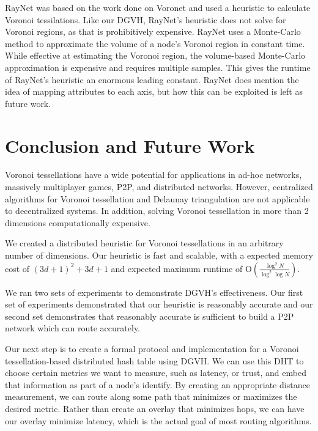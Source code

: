 \documentclass[11pt, conference, letterpaper]{IEEEtran}
\begin{document}
RayNet \cite{raynet} was based on the work done on Voronet and used a heuristic to calculate Voronoi tessilations.  
Like our DGVH, RayNet's heuristic does not solve for Voronoi regions, as that is prohibitively expensive.  
RayNet uses a Monte-Carlo method to approximate the volume of a node's Voronoi region in constant time.  
While effective at estimating the Voronoi region,  the volume-based Monte-Carlo approximation is expensive and requires multiple samples. 
This gives the runtime of RayNet's heuristic an enormous leading constant.
RayNet does mention the idea of mapping attributes to each axis, but how this can be exploited is left as future work.







\section{Conclusion and Future Work}
\label{sec:conclusion}


Voronoi tessellations have a wide potential for applications in ad-hoc networks, massively multiplayer games, P2P, and distributed networks. 
However, centralized algorithms for Voronoi tessellation and Delaunay triangulation are not applicable to decentralized systems.
In addition, solving Voronoi tessellation in more than 2 dimensions computationally expensive.

We created a distributed heuristic for Voronoi tessellations in an arbitrary number of dimensions.
Our heuristic is fast and scalable, with a expected memory cost of $(3d+1)^{2}+3d+1$ and expected maximum runtime of O$(\frac{\log^{2} N}{\log^{2} \log N} )$.

We ran two sets of experiments to demonstrate DGVH's effectiveness.
Our first set of experiments demonstrated that our heuristic is reasonably accurate  and our second set demonstrates that reasonably accurate is sufficient to build a P2P network which can route accurately.


Our next step is to create a formal protocol and implementation for a Voronoi tessellation-based distributed hash table using DGVH.  
We can use this DHT to choose certain metrics we want to measure, such as latency, or trust, and embed that information as part of a node's identify.
By creating an appropriate distance measurement, we can route along some path that minimizes or maximizes the desired metric.
Rather than create an overlay that minimizes hops, we can have our overlay minimize latency, which is the actual goal of most routing algorithms.









\end{document}
